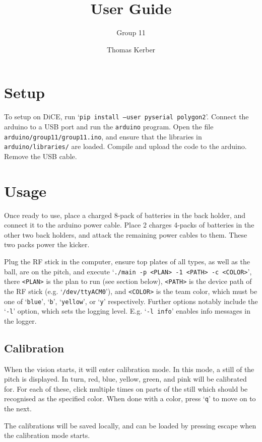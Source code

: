 \documentclass[a4paper]{scrartcl}
\author{Thomas Kerber}
\title{User Guide}
\subtitle{Group 11}
\begin{document}
\maketitle
\section{Setup}

To setup on DiCE, run `\texttt{pip install --user pyserial polygon2}'. Connect
the arduino to a USB port and run the \texttt{arduino} program. Open the file
\verb$arduino/group11/group11.ino$, and ensure that the libraries in
\verb$arduino/libraries/$ are loaded. Compile and upload the code to the
arduino. Remove the USB cable.

\section{Usage}

Once ready to use, place a charged 8-pack of batteries in the back holder, and
connect it to the arduino power cable. Place 2 charges 4-packs of batteries in
the other two back holders, and attack the remaining power cables to them.
These two packs power the kicker.

Plug the RF stick in the computer, ensure top plates of all types, as well as
the ball, are on the pitch, and execute
`\texttt{./main -p <PLAN> -1 <PATH> -c <COLOR>}', there \texttt{<PLAN>} is the
plan to run (see section below), \texttt{<PATH>} is the device path of the RF
stick (e.g. `\verb$/dev/ttyACM0$'), and \texttt{<COLOR>} is the team color,
which must be one of `\texttt{blue}', `\texttt{b}', `\texttt{yellow}', or
`\texttt{y}' respectively. Further options notably include the `\texttt{-l}'
option, which sets the logging level. E.g. `\texttt{-l info}' enables info
messages in the logger.

\subsection{Calibration}

When the vision starts, it will enter calibration mode. In this mode, a still
of the pitch is displayed. In turn, red, blue, yellow, green, and pink will be
calibrated for. For each of these, click multiple times on parts of the still
which should be recognised as the specified color. When done with a color,
press `\texttt{q}' to move on to the next.

The calibrations will be saved locally, and can be loaded by pressing escape
when the calibration mode starts.
\end{document}
